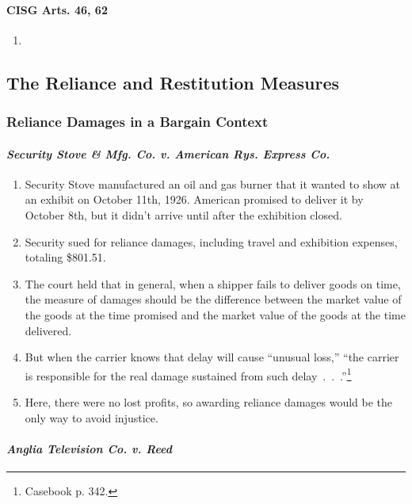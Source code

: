 \paragraph{CISG Arts. 46, 62}

\begin{enumerate}
    \item %
\end{enumerate}

\subsection{The Reliance and Restitution Measures}

\subsubsection{Reliance Damages in a Bargain Context}

\paragraph{\emph{Security Stove \& Mfg. Co. v. American Rys. Express Co.}}

\begin{enumerate}
    \item Security Stove manufactured an oil and gas burner that it wanted to 
    show at an exhibit on October 11th, 1926. American promised to deliver it by 
    October 8th, but it didn't arrive until after the exhibition closed.
    \item Security sued for reliance damages, including travel and exhibition 
    expenses, totaling \$801.51.
    \item The court held that in general, when a shipper fails to deliver 
    goods on time, the measure of damages should be the difference between the 
    market value of the goods at the time promised and the market value of the 
    goods at the time delivered.
    \item But when the carrier knows that delay will cause ``unusual loss,'' 
    ``the carrier is responsible for the real damage sustained from such 
    delay~.~.~.''\footnote{Casebook p. 342.}
    \item Here, there were no lost profits, so awarding reliance damages would 
    be the only way to avoid injustice.
\end{enumerate}

\paragraph{\emph{Anglia Television Co. v. Reed}}

